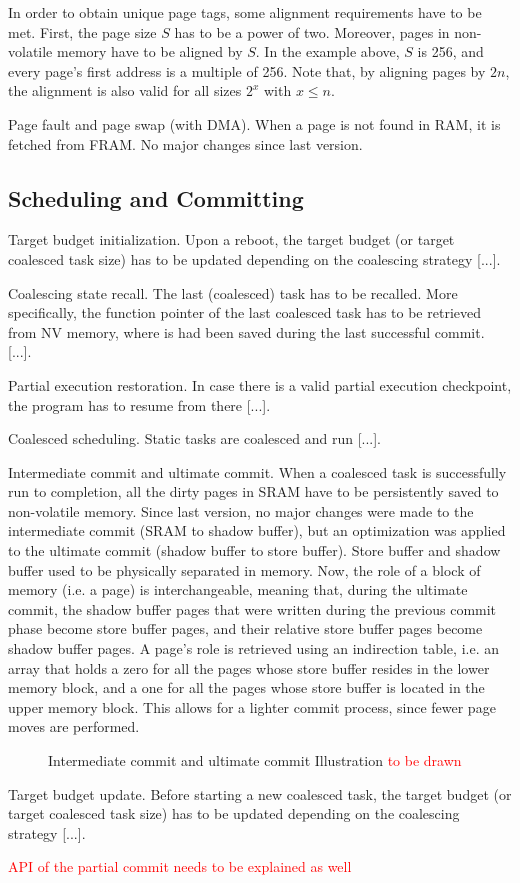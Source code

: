 In order to obtain unique page tags, some alignment requirements have to be met. First, the page size $S$ has to be a power of two. Moreover, pages in non-volatile memory have to be aligned by $S$. In the example above, $S$ is 256, and every page’s first address is a multiple of 256. Note that, by aligning pages by $2n$, the alignment is also valid for all sizes $2^x$ with $x \leq n$.

Page fault and page swap (with DMA). When a page is not found in RAM, it is fetched from FRAM. No major changes since last version.

\subsection{\sys Scheduling and Committing}

Target budget initialization. Upon a reboot, the target budget (or target coalesced task size) has to be updated depending on the coalescing strategy [...].

Coalescing state recall. The last (coalesced) task has to be recalled. More specifically, the function pointer of the last coalesced task has to be retrieved from NV memory, where is had been saved during the last successful commit. [...].

Partial execution restoration. In case there is a valid partial execution checkpoint, the program has to resume from there [...].

Coalesced scheduling. Static tasks are coalesced and run [...].

Intermediate commit and ultimate commit. When a coalesced task is successfully run to completion, all the dirty pages in SRAM have to be persistently saved to non-volatile memory. Since last version, no major changes were made to the intermediate commit (SRAM to shadow buffer), but an optimization was applied to the ultimate commit (shadow buffer to store buffer). Store buffer and shadow buffer used to be physically separated in memory. Now, the role of a block of memory (i.e. a page) is interchangeable, meaning that, during the ultimate commit, the shadow buffer pages that were written during the previous commit phase become store buffer pages, and their relative store buffer pages become shadow buffer pages. A page’s role is retrieved using an indirection table, i.e. an array that holds a zero for all the pages whose store buffer resides in the lower memory block, and a one for all the pages whose store buffer is located in the upper memory block. This allows for a lighter commit process, since fewer page moves are performed.

\begin{figure}
	\caption{Intermediate commit and ultimate commit Illustration \textcolor{red}{to be drawn}}
\end{figure}

Target budget update. Before starting a new coalesced task, the target budget (or target coalesced task size) has to be updated depending on the coalescing strategy [...].

\textcolor{red}{API of the partial commit needs to be explained as well}